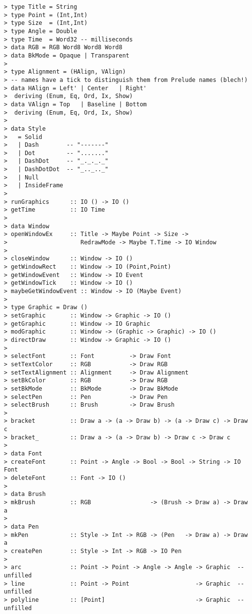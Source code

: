 
\begin{verbatim}
> type Title = String
> type Point = (Int,Int)
> type Size  = (Int,Int)
> type Angle = Double
> type Time  = Word32 -- milliseconds
> data RGB = RGB Word8 Word8 Word8
> data BkMode = Opaque | Transparent
> 
> type Alignment = (HAlign, VAlign)
> -- names have a tick to distinguish them from Prelude names (blech!)
> data HAlign = Left' | Center   | Right'
>  deriving (Enum, Eq, Ord, Ix, Show)
> data VAlign = Top   | Baseline | Bottom
>  deriving (Enum, Eq, Ord, Ix, Show)
> 
> data Style
>   = Solid 
>   | Dash        -- "-------"
>   | Dot         -- "......."  
>   | DashDot     -- "_._._._"  
>   | DashDotDot  -- "_.._.._"  
>   | Null
>   | InsideFrame
> 
> runGraphics      :: IO () -> IO ()
> getTime          :: IO Time
> 
> data Window  
> openWindowEx     :: Title -> Maybe Point -> Size -> 
>                     RedrawMode -> Maybe T.Time -> IO Window
>                  
> closeWindow      :: Window -> IO ()
> getWindowRect    :: Window -> IO (Point,Point)
> getWindowEvent   :: Window -> IO Event
> getWindowTick    :: Window -> IO ()
> maybeGetWindowEvent :: Window -> IO (Maybe Event)
> 
> type Graphic = Draw ()
> setGraphic       :: Window -> Graphic -> IO ()
> getGraphic       :: Window -> IO Graphic
> modGraphic       :: Window -> (Graphic -> Graphic) -> IO ()
> directDraw       :: Window -> Graphic -> IO ()
>                  
> selectFont       :: Font          -> Draw Font  
> setTextColor     :: RGB           -> Draw RGB
> setTextAlignment :: Alignment     -> Draw Alignment
> setBkColor       :: RGB           -> Draw RGB
> setBkMode        :: BkMode        -> Draw BkMode
> selectPen        :: Pen           -> Draw Pen  
> selectBrush      :: Brush         -> Draw Brush
> 
> bracket          :: Draw a -> (a -> Draw b) -> (a -> Draw c) -> Draw c
> bracket_         :: Draw a -> (a -> Draw b) -> Draw c -> Draw c
>                  
> data Font        
> createFont       :: Point -> Angle -> Bool -> Bool -> String -> IO Font
> deleteFont       :: Font -> IO ()
> 
> data Brush
> mkBrush          :: RGB                 -> (Brush -> Draw a) -> Draw a
>                  
> data Pen         
> mkPen            :: Style -> Int -> RGB -> (Pen   -> Draw a) -> Draw a
> createPen        :: Style -> Int -> RGB -> IO Pen
> 
> arc              :: Point -> Point -> Angle -> Angle -> Graphic  -- unfilled
> line             :: Point -> Point                   -> Graphic  -- unfilled
> polyline         :: [Point]                          -> Graphic  -- unfilled

\end{verbatim}
